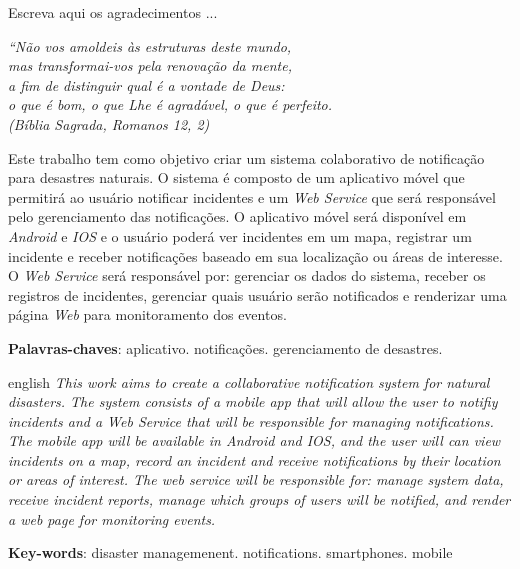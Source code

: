 \documentclass[	12pt, Times, openright, twoside, a4paper, english, brazil]{abntex2}
\begin{document}
\begin{agradecimentos}
Escreva aqui os agradecimentos ...

\end{agradecimentos}

\begin{epigrafe}
    \vspace*{\fill}
	\begin{flushright}
		\textit{``Não vos amoldeis às estruturas deste mundo, \\
		mas transformai-vos pela renovação da mente, \\
		a fim de distinguir qual é a vontade de Deus: \\
		o que é bom, o que Lhe é agradável, o que é perfeito.\\
		(Bíblia Sagrada, Romanos 12, 2)}
	\end{flushright}
\end{epigrafe}


\begin{resumo}
Este trabalho tem como objetivo criar um sistema colaborativo de notificação para desastres naturais. O sistema é composto de um aplicativo móvel que permitirá ao usuário notificar incidentes e um \textit{Web Service} que será responsável pelo gerenciamento das notificações. O aplicativo móvel será disponível em \textit{Android} e \textit{IOS} e o usuário poderá ver incidentes em um mapa, registrar um incidente e receber notificações baseado em sua localização ou áreas de interesse. O \textit{Web Service} será responsável por: gerenciar os dados do sistema, receber os registros de incidentes, gerenciar quais usuário serão notificados e renderizar uma página \textit{Web} para monitoramento dos eventos.
 
 \vspace{\onelineskip}
    
 \noindent
 \textbf{Palavras-chaves}: aplicativo. notificações. gerenciamento de desastres.
\end{resumo}

\begin{resumo}[Abstract]
 \begin{otherlanguage*}{english}
   \textit{This work aims to create a collaborative notification system for natural disasters. The system consists of a mobile app that will allow
   the user to notifiy incidents and a Web Service that will be responsible for managing notifications. The mobile app will be available in Android and IOS, and the user will can view incidents on a map, record an incident and receive notifications by their location or areas of interest. The web service will be responsible for: manage system data, receive incident reports, manage which groups of users will be notified, and render a web page for monitoring events.}
   \vspace{\onelineskip}
 
   \noindent 
   \textbf{Key-words}: disaster managemenent. notifications. smartphones. mobile
 \end{otherlanguage*}
\end{resumo}
\end{document}
